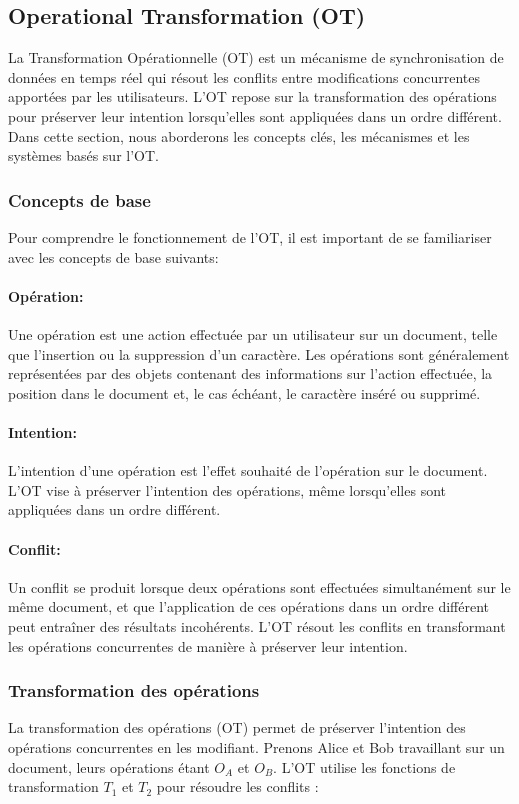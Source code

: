 \subsection{Operational Transformation (OT)}
La Transformation Opérationnelle (OT) est un mécanisme de synchronisation de données en temps réel qui résout les conflits entre modifications concurrentes apportées par les utilisateurs. L'OT repose sur la transformation des opérations pour préserver leur intention lorsqu'elles sont appliquées dans un ordre différent. Dans cette section, nous aborderons les concepts clés, les mécanismes et les systèmes basés sur l'OT.

\subsubsection{Concepts de base}
Pour comprendre le fonctionnement de l'OT, il est important de se familiariser avec les concepts de base suivants:

\paragraph{Opération:} Une opération est une action effectuée par un utilisateur sur un document, telle que l'insertion ou la suppression d'un caractère. Les opérations sont généralement représentées par des objets contenant des informations sur l'action effectuée, la position dans le document et, le cas échéant, le caractère inséré ou supprimé.
\paragraph{Intention:} L'intention d'une opération est l'effet souhaité de l'opération sur le document. L'OT vise à préserver l'intention des opérations, même lorsqu'elles sont appliquées dans un ordre différent.
\paragraph{Conflit:} Un conflit se produit lorsque deux opérations sont effectuées simultanément sur le même document, et que l'application de ces opérations dans un ordre différent peut entraîner des résultats incohérents. L'OT résout les conflits en transformant les opérations concurrentes de manière à préserver leur intention.

\subsubsection{Transformation des opérations}
La transformation des opérations (OT) permet de préserver l'intention des opérations concurrentes en les modifiant. Prenons Alice et Bob travaillant sur un document, leurs opérations étant $O_A$ et $O_B$. L'OT utilise les fonctions de transformation $T_1$ et $T_2$ pour résoudre les conflits :

